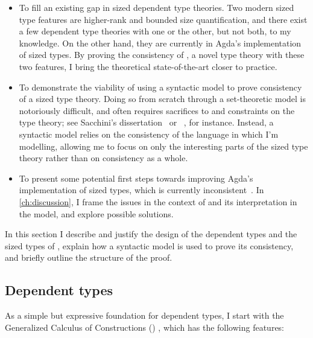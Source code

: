 \begin{itemize}
  \item To fill an existing gap in sized dependent type theories.
    Two modern sized type features are higher-rank and bounded size quantification,
    and there exist a few dependent type theories with one or the other,
    but not both, to my knowledge.
    On the other hand, they are currently in Agda's implementation of sized types.
    By proving the consistency of \lang, a novel type theory with these two features,
    I bring the theoretical state-of-the-art closer to practice.
  \item To demonstrate the viability of using a syntactic model to prove consistency
    of a sized type theory.
    Doing so from scratch through a set-theoretic model is notoriously difficult,
    and often requires sacrifices to and constraints on the type theory;
    see Sacchini's dissertation~\citep{CIC-hat-minus} or \CIChatstar~\citep{CIC-hat-star},
    for instance.
    Instead, a syntactic model relies on the consistency of the language in which I'm modelling,
    allowing me to focus on only the interesting parts of the sized type theory
    rather than on consistency as a whole.
  \item To present some potential first steps towards improving Agda's implementation of sized types,
    which is currently inconsistent~\citep{infinity}.
    In \cref{ch:discussion}, I frame the issues in the context of \lang
    and its interpretation in the model,
    and explore possible solutions.
\end{itemize}

In this section I describe and justify the design of
the dependent types and the sized types of \lang,
explain how a syntactic model is used to prove its consistency,
and briefly outline the structure of the proof.

\subsection{Dependent types}

As a simple but expressive foundation for dependent types,
I start with the Generalized Calculus of Constructions (\GCC) \citep{GCC-Coquand},
which has the following features:

